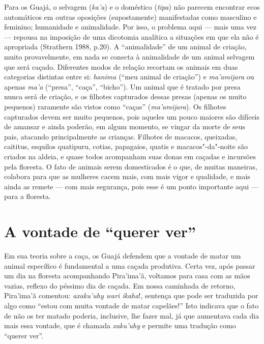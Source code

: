 Para os Guajá, o selvagem (\emph{ka'a}) e o doméstico (\emph{tipa}) não
parecem encontrar ecos automáticos em outras oposições (supostamente)
manifestadas como masculino e feminino; humanidade e animalidade. Por
isso, o problema aqui --- mais uma vez --- repousa na imposição de uma
dicotomia analítica a situações em que ela não é apropriada (Strathern
1988, p.20). A ``animalidade'' de um animal de criação, muito
provavelmente, em nada se conecta à animalidade de um animal selvagem
que será caçado. Diferentes modos de relação recortam os animais em duas
categorias distintas entre si: \emph{hanima} (``meu animal de criação'')
e \emph{ma'amijara} ou apenas \emph{ma'a} (``presa'', ``caça'',
``bicho''). Um animal que é tratado por presa nunca será de criação, e
os filhotes capturados dessas presas (apenas os muito pequenos)
raramente são vistos como ``caças'' (\emph{ma'amijara}). Os filhotes
capturados devem ser muito pequenos, pois aqueles um pouco maiores são
difíceis de amansar e ainda poderão, em algum momento, se vingar da
morte de seus pais, atacando principalmente as crianças. Filhotes de
macacos, queixadas, caititus, esquilos quatipuru, cotias, papagaios,
quatis e macacos"-da"-noite são criados na aldeia, e quase todos
acompanham suas donas em caçadas e incursões pela floresta. O fato de
animais serem domesticados é o que, de muitas maneiras, colabora para
que as mulheres cacem mais, com mais vigor e qualidade, e mais ainda as
remete --- com mais segurança, pois esse é um ponto importante aqui --- para
a floresta.

\section{A vontade de ``querer ver''}\label{a-vontade-de-querer-ver}

Em sua teoria sobre a caça, os Guajá defendem que a vontade de matar um
animal específico é fundamental a uma caçada produtiva. Certa vez, após
passar um dia na floresta acompanhando Pira'ima'ã, voltamos para casa
com as mãos vazias, reflexo do péssimo dia de caçada. Em nossa caminhada
de retorno, Pira'ima'ã comentou: \emph{axaku'uhy wari ikaha}!, sentença
que pode ser traduzida por algo como ``estou com muita vontade de matar
capelães!'' Isto indicava que o fato de não os ter matado poderia,
inclusive, lhe fazer mal, já que aumentava cada dia mais essa vontade,
que é chamada \emph{xaku'uhy} e permite uma tradução como ``querer ver''.

